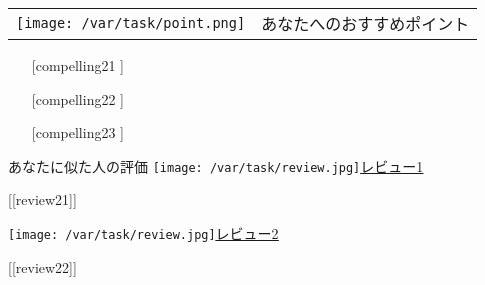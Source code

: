\documentclass[lualatex,paper=a4,airticle]{jlreq}
\begin{document}
\begin{minipage}[b][0.43\textheight][t]{\textwidth}
\begin{multicols}{2}
    \hspace{-2.3cm} %
    \begin{minipage}{1.25\columnwidth}
      \vspace{-0.4cm}
      \begin{itembox}[l]{
        \begin{tabular}{@{}m{9mm}@{}m{6cm}}
          \texttt{[image: /var/task/point.png]} & \gtfamily\ebseries\large あなたへのおすすめポイント
        \end{tabular}
      }
        \vspace{-1\baselineskip}
        \begin{itemize}
          \setlength{\itemindent}{-10pt}
          \item [[compelling21]]
          \item [[compelling22]]
          \item [[compelling23]]
        \end{itemize}
      \end{itembox}
    \end{minipage}


    \hspace{-2.3cm} %
    \begin{minipage}{1.25\columnwidth}
      \begin{itembox}[l]{{\gtfamily\ebseries\large あなたに似た人の評価}}
        \vspace{-3mm}
        \texttt{[image: /var/task/review.jpg]}\href{[[review_url21]]}{\color{blue}\underline{レビュー1}}\par
        \begin{spacing}{0.5}
          {\small [[review21]]}\par
        \end{spacing}
        \vspace{2mm}
        \texttt{[image: /var/task/review.jpg]}\href{[[review_url22]]}{\color{blue}\underline{レビュー2}}\par
        \begin{spacing}{0.5}
          {\small [[review22]]}\par
        \end{spacing}
        \vspace{2mm}
      \end{itembox}
    \end{minipage}

  \end{multicols}
\end{minipage}
\end{document}
